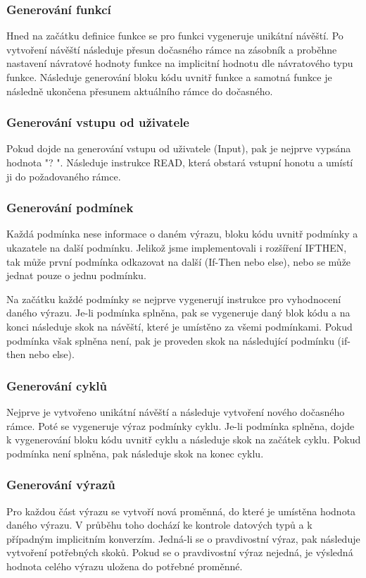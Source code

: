 \documentclass[11pt,a4paper]{article}
\begin{document}
    \subsubsection{Generování funkcí}
    Hned na začátku definice funkce se pro funkci vygeneruje unikátní návěští. Po vytvoření návěští následuje přesun dočasného rámce na zásobník a proběhne nastavení návratové hodnoty funkce na implicitní hodnotu dle návratového typu funkce. Následuje generování bloku kódu uvnitř funkce a samotná funkce je následně ukončena přesunem aktuálního rámce do dočasného.

    \subsubsection{Generování vstupu od uživatele}
    Pokud dojde na generování vstupu od uživatele (Input), pak je nejprve vypsána hodnota "? ". Následuje instrukce READ, která obstará vstupní honotu a umístí ji do požadovaného rámce.

    \subsubsection{Generování podmínek}
    Každá podmínka nese informace o daném výrazu, bloku kódu uvnitř podmínky a ukazatele na další podmínku. Jelikož jsme implementovali i rozšíření IFTHEN, tak může první podmínka odkazovat na další (If-Then nebo else), nebo se může jednat pouze o jednu podmínku.

    Na začátku každé podmínky se nejprve vygenerují instrukce pro vyhodnocení daného výrazu. Je-li podmínka splněna, pak se vygeneruje daný blok kódu a na konci následuje skok na návěští, které je umístěno za všemi podmínkami. Pokud podmínka však splněna není, pak je proveden skok na následující podmínku (if-then nebo else).

    \subsubsection{Generování cyklů}
    Nejprve je vytvořeno unikátní návěští a následuje vytvoření nového dočasného rámce. Poté se vygeneruje výraz podmínky cyklu. Je-li podmínka splněna, dojde k vygenerování bloku kódu uvnitř cyklu a následuje skok na začátek cyklu. Pokud podmínka není splněna, pak následuje skok na konec cyklu.

    \subsubsection{Generování výrazů}
    Pro každou část výrazu se vytvoří nová proměnná, do které je umístěna hodnota daného výrazu. V průběhu toho dochází ke kontrole datových typů a k případným implicitním konverzím.
    Jedná-li se o pravdivostní výraz, pak následuje vytvoření potřebných skoků. Pokud se o pravdivostní výraz nejedná, je výsledná hodnota celého výrazu uložena do potřebné proměnné.
\end{document}

